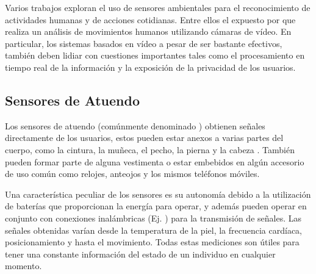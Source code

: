 Varios trabajos exploran el uso de sensores ambientales para el reconocimiento
de actividades humanas y de acciones cotidianas. Entre ellos el expuesto
por \cite{Poppe2007} que realiza un análisis de movimientos humanos
utilizando cámaras de vídeo. En particular, los sistemas basados en
vídeo a pesar de ser bastante efectivos, también deben lidiar con
cuestiones importantes tales como el procesamiento en tiempo real
de la información y la exposición de la privacidad de los usuarios.

\subsection{Sensores de Atuendo}

Los sensores de atuendo (comúnmente denominado\emph{ })
obtienen señales directamente de los usuarios, estos pueden estar
anexos a varias partes del cuerpo, como la cintura, la muñeca, el
pecho, la pierna y la cabeza \cite{Bao2004}. También pueden formar
parte de alguna vestimenta o estar embebidos en algún accesorio de
uso común como relojes, anteojos y los mismos teléfonos móviles. 

Una característica peculiar de los sensores es su autonomía debido
a la utilización de baterías que proporcionan la energía para operar,
y además pueden operar en conjunto con conexiones inalámbricas (Ej.
\emph{}) para la transmisión de señales. Las señales
obtenidas varían desde la temperatura de la piel, la frecuencia cardíaca,
posicionamiento y hasta el movimiento. Todas estas mediciones son
útiles para tener una constante información del estado de un individuo
en cualquier momento.

